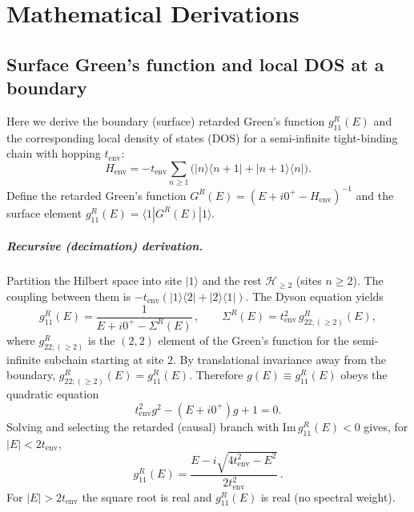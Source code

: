 \documentclass[12pt,oneside,openright]{report}
\theoremstyle{definition}
\theoremstyle{plain}
\theoremstyle{remark}
\begin{document}
\cleardoublepage

\cleardoublepage
{}
{}
\printbibliography[title=Bibliography]

\appendix
{}
{}

\chapter{Mathematical Derivations}
\label{app:derivations}

\section{Surface Green's function and local DOS at a boundary}
\label{app:surface_gf}
Here we derive the boundary (surface) retarded Green's function $g^{R}_{11}(E)$ and the corresponding local density of states (DOS) for a semi-infinite tight-binding chain with hopping $t_{\mathrm{env}}$:
\begin{equation}
 H_{\mathrm{env}} = -t_{\mathrm{env}} \sum_{n\ge 1} \big( |n\rangle\langle n{+}1| + |n{+}1\rangle\langle n| \big).
\end{equation}
Define the retarded Green's function $G^{R}(E) = (E + i0^{+} - H_{\mathrm{env}})^{-1}$ and the surface element $g^{R}_{11}(E) = \langle 1| G^{R}(E) |1\rangle$.

\paragraph{Recursive (decimation) derivation.}
Partition the Hilbert space into site $|1\rangle$ and the rest $\mathcal{H}_{\ge 2}$ (sites $n\ge 2$). The coupling between them is $-t_{\mathrm{env}} (|1\rangle\langle 2| + |2\rangle\langle 1|)$. The Dyson equation yields
\begin{equation}
 g^{R}_{11}(E) = \frac{1}{E + i0^{+} - \Sigma^{R}(E)}\,, \qquad \Sigma^{R}(E) = t_{\mathrm{env}}^{2}\, g^{R}_{22;(\ge 2)}(E),
\end{equation}
where $g^{R}_{22;(\ge 2)}$ is the $(2,2)$ element of the Green's function for the semi-infinite subchain starting at site $2$. By translational invariance away from the boundary, $g^{R}_{22;(\ge 2)}(E) = g^{R}_{11}(E)$. Therefore $g(E) \equiv g^{R}_{11}(E)$ obeys the quadratic equation
\begin{equation}
 t_{\mathrm{env}}^{2} g^{2} - (E + i0^{+}) g + 1 = 0.
 \label{app:eq:quad_g}
\end{equation}
Solving and selecting the retarded (causal) branch with $\mathrm{Im}\,g^{R}_{11}(E)<0$ gives, for $|E|<2 t_{\mathrm{env}}$,
\begin{equation}
 g^{R}_{11}(E) = \frac{E - i\sqrt{4 t_{\mathrm{env}}^{2} - E^{2}}}{2 t_{\mathrm{env}}^{2}}\,.
 \label{app:eq:surface_gf}
\end{equation}
For $|E|>2 t_{\mathrm{env}}$ the square root is real and $g^{R}_{11}(E)$ is real (no spectral weight).
\end{document}
